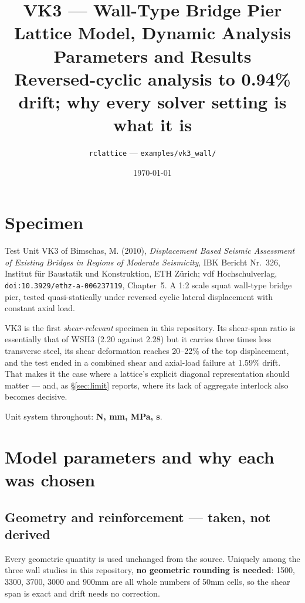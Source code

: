 \documentclass[11pt,a4paper]{article}
\title{\vspace{-14mm}\textbf{VK3 --- Wall-Type Bridge Pier}\\[2mm]
\large Lattice Model, Dynamic Analysis Parameters and Results\\[1mm]
\normalsize Reversed-cyclic analysis to 0.94\% drift; why every solver setting is what it is}
\author{\normalsize \texttt{rclattice} --- \texttt{examples/vk3\_wall/}}
\date{\normalsize \today}
\begin{document}
\maketitle
\thispagestyle{empty}

\section*{Specimen}

Test Unit VK3 of Bimschas, M. (2010), \emph{Displacement Based Seismic Assessment of Existing
Bridges in Regions of Moderate Seismicity}, IBK Bericht Nr.~326, Institut für Baustatik und
Konstruktion, ETH Zürich; vdf Hochschulverlag, \texttt{doi:10.3929/ethz-a-006237119}, Chapter~5.
A 1:2 scale squat wall-type bridge pier, tested quasi-statically under reversed cyclic lateral
displacement with constant axial load.

VK3 is the first \emph{shear-relevant} specimen in this repository. Its shear-span ratio is
essentially that of WSH3 (2.20 against 2.28) but it carries three times less transverse steel, its
shear deformation reaches 20--22\% of the top displacement, and the test ended in a combined shear
and axial-load failure at 1.59\% drift. That makes it the case where a lattice's explicit diagonal
representation should matter --- and, as \S\ref{sec:limit} reports, where its lack of aggregate
interlock also becomes decisive.

Unit system throughout: \textbf{N, mm, MPa, s}.

\section{Model parameters and why each was chosen}

\subsection{Geometry and reinforcement --- taken, not derived}

Every geometric quantity is used unchanged from the source. Uniquely among the three wall studies
in this repository, \textbf{no geometric rounding is needed}: 1500, 3300, 3700, 3000 and 900\unit{mm}
are all whole numbers of 50\unit{mm} cells, so the shear span is exact and drift needs no correction.
\end{document}
